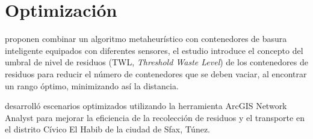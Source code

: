 \chapter{Optimización}
\label{chap4}
\ifpdf
  \graphicspath{{Chapter4/Chapter4Figs/PNG/}{Chapter4/Chapter4Figs/PDF/}{Chapter4/Chapter4Figs/}}
\else
  \graphicspath{{Chapter4/Chapter4Figs/EPS/}{Chapter4/Chapter4Figs/}}
\fi


\citet{Akhtar2017BacktrackingOptimization} proponen combinar un algoritmo metaheurístico con contenedores de basura inteligente equipados con diferentes sensores, el estudio introduce el concepto del umbral de nivel de residuos (TWL, \textit{Threshold Waste Level}) de los contenedores de residuos para reducir el número de contenedores que se deben vaciar, al encontrar un rango óptimo, minimizando así la distancia.

\citet{Kallel2016UsingTunisia} desarrolló escenarios optimizados utilizando la herramienta ArcGIS Network Analyst para mejorar la eficiencia de la recolección de residuos y el transporte en el distrito Cívico El Habib de la ciudad de Sfax, Túnez.

